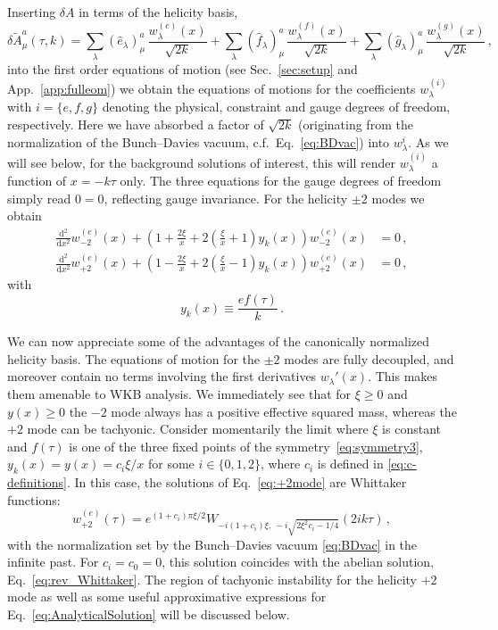 Inserting $\delta A$ in terms of the helicity basis,
\begin{equation}\label{eq:w-lambda-def}
 \delta \tilde{A}^a_\mu(\tau,k) =   \sum_{\lambda}( \hat e_\lambda)^a_\mu \, \frac{ w^{(e)}_\lambda(x) }{\sqrt{2k}} +  \sum_{\lambda}( \hat f_\lambda)^a_\mu \, \frac{ w^{(f)}_\lambda(x) }{\sqrt{2k}} + \sum_{\lambda}( \hat g_\lambda)^a_\mu \, \frac{ w^{(g)}_\lambda(x) }{\sqrt{2k}} \,,
\end{equation}
into the first order equations of motion (see Sec.~\ref{sec:setup} and App.~\ref{app:fulleom}) we  obtain the equations of motions for the coefficients $w^{(i)}_\lambda$ with $i = \{e, f, g \}$ denoting the physical, constraint and gauge degrees of freedom, respectively. Here we have absorbed a factor of $\sqrt{2k}$  (originating from the normalization of the Bunch--Davies vacuum, c.f.\ Eq.~\eqref{eq:BDvac}) into $w_\lambda^{i}$. As we will see below,  for the background solutions of interest, this will render $w^{(i)}_\lambda$ a function of $x = - k \tau$ only. The three equations for the gauge degrees of freedom simply read $0 = 0$, reflecting gauge invariance. For the helicity $\pm2$ modes we obtain
\begin{align*}
\frac{\textrm{d}^2 }{\textrm{d}x^2} w^{(e)}_{-2}(x)+\left(1+\frac{2\xi}{x}+2\left(\frac{\xi}{x}+1\right)y_k(x)\right)w^{(e)}_{-2}(x) & =0\,, \label{eq:-2mode}\\
\frac{\textrm{d}^2}{\textrm{d}x^2}w^{(e)}_{+2}(x) +\left(1-\frac{2\xi}{x}+2\left(\frac{\xi}{x}-1\right)y_k(x)\right)w^{(e)}_{+2}(x) & =0\,,
\label{eq:+2mode}
\end{align*}
with 
\begin{equation}
\label{eq:y_definition}
 y_k(x) \equiv \frac{e f(\tau)}{k} \,.
\end{equation}



We can now appreciate some of the advantages of the canonically normalized helicity basis. The equations of motion for the $\pm 2$ modes are fully decoupled, and moreover contain no terms involving the first derivatives $w_\lambda'(x)$. This makes them amenable to WKB analysis. We immediately see that for $\xi \geq 0$ and $y(x) \geq 0$ the $-2$ mode always has a positive effective squared mass, whereas the $+2$ mode can be tachyonic. Consider momentarily the limit where $\xi$ is constant and $f(\tau)$ is one of the three fixed points of the symmetry~\eqref{eq:symmetry3},  $y_k(x) = y(x) = c_i\xi/x$ for some $i\in\{0,1,2\}$, where $c_i$ is defined in \eqref{eq:c-definitions}. In this case, the solutions of Eq.~\eqref{eq:+2mode} are Whittaker functions:  
 \[ w_{+2}^{(e)}(\tau)= e^{(1+c_{i})\pi\xi/2} W_{-i(1+c_{i})\xi,\,-i\sqrt{2\xi^{2}c_{i}-1/4}}\left(2ik\tau\right) \,,  \label{eq:AnalyticalSolution}  \]  
with the normalization set by the Bunch--Davies vacuum \eqref{eq:BDvac} in the infinite past. For  $c_i=c_0=0$, this solution coincides with the abelian solution, Eq.~\eqref{eq:rev_Whittaker}. The region of tachyonic instability for the helicity $+2$ mode as well as some useful approximative expressions for Eq.~\eqref{eq:AnalyticalSolution} will be discussed below.

